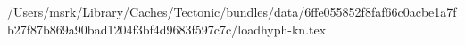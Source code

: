 /Users/msrk/Library/Caches/Tectonic/bundles/data/6ffe055852f8faf66c0acbe1a7fb27f87b869a90bad1204f3bf4d9683f597c7c/loadhyph-kn.tex